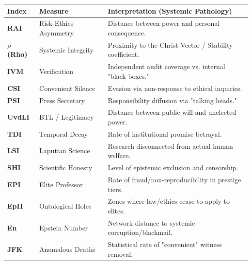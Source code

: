 \documentclass[11pt,a4paper]{article}
\theoremstyle{definition}
\theoremstyle{remark}
\begin{document}



\begin{table}[h!]
\centering
\small
\begin{tabular}{|l|l|l|}
\hline
\textbf{Index} & \textbf{Measure} & \textbf{Interpretation (Systemic Pathology)} \\ \hline
\textbf{RAI} & Risk-Ethics Asymmetry & Distance between power and personal consequence. \\ \hline
\textbf{$\rho$ (Rho)} & Systemic Integrity & Proximity to the Christ-Vector / Stability coefficient. \\ \hline
\textbf{IVM} & Verification & Independent audit coverage vs. internal "black boxes." \\ \hline
\textbf{CSI} & Convenient Silence & Evasion via non-response to ethical inquiries. \\ \hline
\textbf{PSI} & Press Secretary & Responsibility diffusion via "talking heads." \\ \hline
\textbf{UvdLI} & BTL / Legitimacy & Distance between public will and unelected power. \\ \hline
\textbf{TDI} & Temporal Decay & Rate of institutional promise betrayal. \\ \hline
\textbf{LSI} & Laputian Science & Research disconnected from actual human welfare. \\ \hline
\textbf{SHI} & Scientific Honesty & Level of epistemic exclusion and censorship. \\ \hline
\textbf{EPI} & Elite Professor & Rate of fraud/non-reproducibility in prestige tiers. \\ \hline
\textbf{EpII} & Ontological Holes & Zones where law/ethics cease to apply to elites. \\ \hline
\textbf{En} & Epstein Number & Network distance to systemic corruption/blackmail. \\ \hline
\textbf{JFK} & Anomalous Deaths & Statistical rate of "convenient" witness removal. \\ \hline

\end{tabular}
\end{table}
\end{document}
